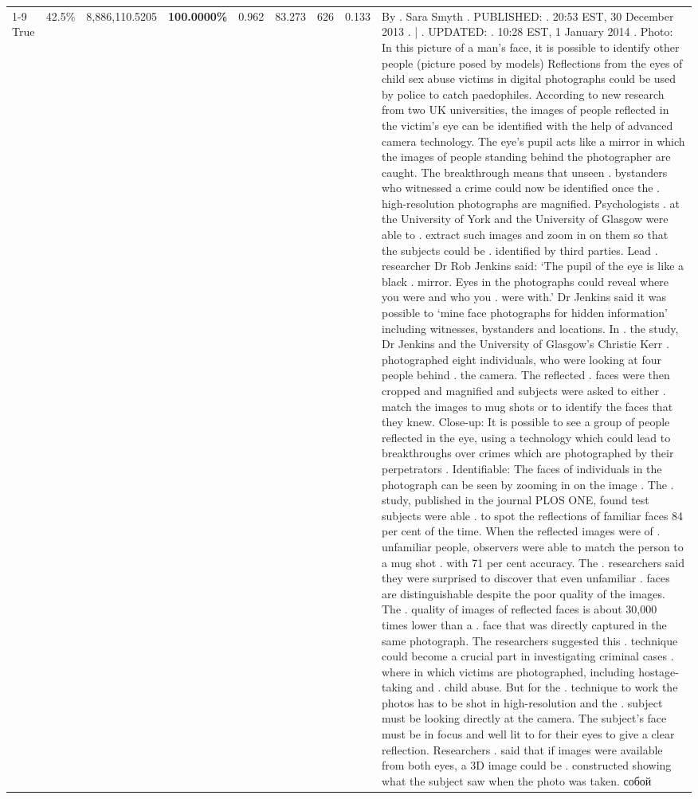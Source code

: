 \begin{table}[H]
\begin{tabular}{lllrlllll}
\cline{1-9} \cline{2-9}
True & 42.5\% & 8,886,110.5205 & \bfseries \color{red} 100.0000\% & 0.962 & 83.273 & 626 & 0.133 & By . Sara Smyth . PUBLISHED: . 20:53 EST, 30 December 2013 . | . UPDATED: . 10:28 EST, 1 January 2014 . Photo: In this picture of a man's face, it is possible to identify other people (picture posed by models) Reflections from the eyes of child sex abuse victims in digital photographs could be used by police to catch paedophiles. According to new research from two UK universities, the images of people reflected in the victim's eye can be identified with the help of advanced camera technology. The eye's pupil acts like a mirror in which the images of people standing behind the photographer are caught. The breakthrough means that unseen . bystanders who witnessed a crime could now be identified once the . high-resolution photographs are magnified. Psychologists . at the University of York and the University of Glasgow were able to . extract such images and zoom in on them so that the subjects could be . identified by third parties. Lead . researcher Dr Rob Jenkins said: ‘The pupil of the eye is like a black . mirror. Eyes in the photographs could reveal where you were and who you . were with.' Dr Jenkins said it was possible to ‘mine face photographs for hidden information' including witnesses, bystanders and locations. In . the study, Dr Jenkins and the University of Glasgow's Christie Kerr . photographed eight individuals, who were looking at four people behind . the camera. The reflected . faces were then cropped and magnified and subjects were asked to either . match the images to mug shots or to identify the faces that they knew. Close-up: It is possible to see a group of people reflected in the eye, using a technology which could lead to breakthroughs over crimes which are photographed by their perpetrators . Identifiable: The faces of individuals in the photograph can be seen by zooming in on the image . The . study, published in the journal PLOS ONE, found test subjects were able . to spot the reflections of familiar faces 84 per cent of the time. When the reflected images were of . unfamiliar people, observers were able to match the person to a mug shot . with 71 per cent accuracy. The . researchers said they were surprised to discover that even unfamiliar . faces are distinguishable despite the poor quality of the images. The . quality of images of reflected faces is about 30,000 times lower than a . face that was directly captured in the same photograph. The researchers suggested this . technique could become a crucial part in investigating criminal cases . where in which victims are photographed, including hostage-taking and . child abuse. But for the . technique to work the photos has to be shot in high-resolution and the . subject must be looking directly at the camera. The subject's face must be in focus and well lit to for their eyes to give a clear reflection. Researchers . said that if images were available from both eyes, a 3D image could be . constructed showing what the subject saw when the photo was taken. собой \\

\end{tabular}
\end{table}
